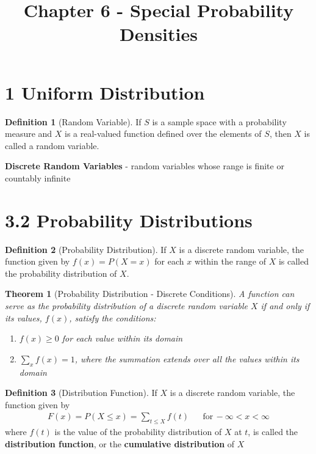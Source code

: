 \documentclass[
10pt,reqno
]{amsart}
\title{Chapter 6 - Special Probability Densities}
\newtheorem{thm}{Theorem}[section]
\theoremstyle{definition}
\newtheorem{definition}{Definition}[section]
\begin{document}
\maketitle

\tableofcontents
\newpage

\section*{1 Uniform Distribution}

\begin{definition}[Random Variable]
If \(S\) is a sample space with a probability measure and \(X\) is a real-valued function defined over the elements of \(S\), then \(X\) is called a random variable.
\end{definition}

\textbf{Discrete Random Variables} - random variables whose range is finite or countably infinite

\section*{3.2 Probability Distributions}

\begin{definition}[Probability Distribution]
If \(X\) is a discrete random variable, the function given by \(f(x)=P(X=x)\) for each \(x\) within the range of \(X\) is called the probability distribution of \(X\).
\end{definition}

\begin{thm}[Probability Distribution - Discrete Conditions]
\label{thm:ProbDistDiscrete}
A function can serve as the probability distribution of a discrete random variable \(X\) if and only if its values, \(f(x)\), satisfy the conditions:
\begin{enumerate}
	\item \(f(x) \ge 0\) for each value within its domain
	\item \(\sum_{x} f(x)=1\), where the summation extends over all the values within its domain
\end{enumerate}
\end{thm}

\begin{definition}[Distribution Function]
If \(X\) is a discrete random variable, the function given by
\begin{align*}
F(x)=P(X \leq x) = \sum_{t \leq X} f(t) && \text{for} \,-\infty < x < \infty
\end{align*}
where \(f(t)\) is the value of the probability distribution of \(X\) at \(t\), is called the \textbf{distribution function}, or the \textbf{cumulative distribution} of \(X\)
\end{definition}
\end{document}
